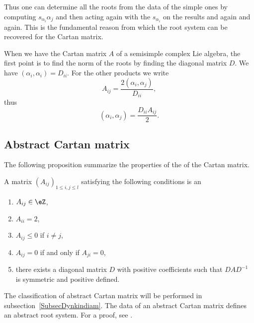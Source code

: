 Thus one can determine all the roots from the data of the simple ones by computing \( s_{\alpha_i}\alpha_j\) and then acting again with the \( s_{\alpha_i}\) on the results and again and again. This is the fundamental reason from which the root system can be recovered for the Cartan matrix.


When we have the Cartan matrix \( A \) of a semisimple complex Lie algebra, the first point is to find the norm of the roots by finding the diagonal matrix \( D\). We have \( (\alpha_i,\alpha_i)=D_{ii}\). For the other products we write
\begin{equation}
	A_{ij}=\frac{ 2(\alpha_i,\alpha_j) }{ D_{ii} },
\end{equation}
thus
\begin{equation}
	(\alpha_i,\alpha_j)=\frac{ D_{ii}A_{ij} }{ 2 }.
\end{equation}

\subsection{Abstract Cartan matrix}

The following proposition summarize the properties of the of the Cartan matrix.
\begin{definition}      \label{DeabstrCartanmatr}
	A matrix \( (A_{ij})_{1\leq i,j\leq l}\) satisfying the following conditions is an 
	\begin{enumerate}
		\item
		      \( A_{ij}\in\eZ\),
		\item
		      \( A_{ii}=2\),
		\item   \label{ItempoprCartaniii}
		      \( A_{ij}\leq 0\) if \( i\neq j\),
		\item
		      \( A_{ij}=0\) if and only if \( A_{ji}=0\),
		      \item\label{ItempoprCartanv}
		      there exists a diagonal matrix \( D\) with positive coefficients such that \( DAD^{-1}\) is symmetric and positive defined.
	\end{enumerate}
\end{definition}
The classification of abstract Cartan matrix will be performed in subsection~\ref{SubsecDynkindiam}. The data of an abstract Cartan matrix defines an abstract root system. For a proof, see \cite{CartanRootProject}.

